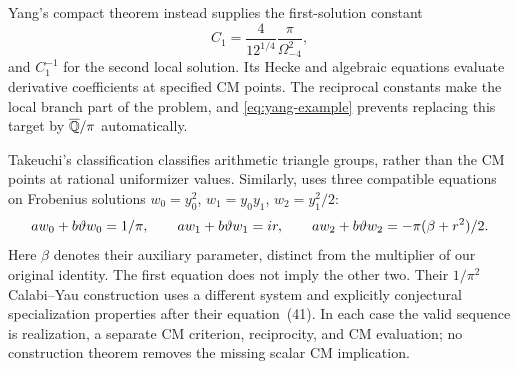 Yang's compact theorem instead supplies the first-solution constant
\[
 C_1=\frac4{12^{1/4}}\frac{\pi}{\Omega_{-4}^2},
\]
and $C_1^{-1}$ for the second local solution. Its Hecke and algebraic
equations evaluate derivative coefficients at specified CM points.
The reciprocal constants make the local branch part of the problem,
and \eqref{eq:yang-example} prevents replacing this target by
$\overline{\mathbb Q}/\pi$ automatically.

Takeuchi's classification \cite{Takeuchi} classifies arithmetic triangle
groups, rather than the CM points at rational uniformizer values.
Similarly, \cite[Theorem~2.2]{AG} uses three compatible equations
on Frobenius solutions $w_0=y_0^2$, $w_1=y_0y_1$, $w_2=y_1^2/2$:
\[
 aw_0+b\vartheta w_0=1/\pi,\qquad
 aw_1+b\vartheta w_1=ir,\qquad
 aw_2+b\vartheta w_2=-\pi(\beta+r^2)/2.
\]
Here $\beta$ denotes their auxiliary parameter, distinct from the
multiplier of our original identity. The first equation does not
imply the other two. Their $1/\pi^2$ Calabi--Yau construction uses
a different system and explicitly conjectural specialization
properties after their equation~(41). In each case the valid
sequence is realization, a separate CM criterion, reciprocity, and
CM evaluation; no construction theorem removes the missing scalar
CM implication.
